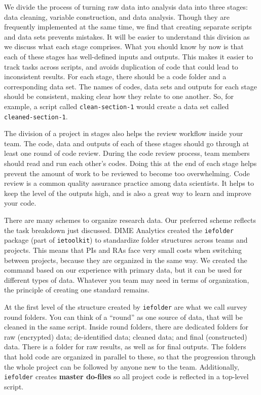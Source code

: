 We divide the process of turning raw data into analysis data into three stages: 
data cleaning, variable construction, and data analysis. 
Though they are frequently implemented at the same time, 
we find that creating separate scripts and data sets prevents mistakes. 
It will be easier to understand this division as we discuss what each stage comprises. 
What you should know by now is that each of these stages has well-defined inputs and outputs. 
This makes it easier to track tasks across scripts, 
and avoids duplication of code that could lead to inconsistent results. 
For each stage, there should be a code folder and a corresponding data set. 
The names of codes, data sets and outputs for each stage should be consistent,
making clear how they relate to one another. 
So, for example, a script called \texttt{clean-section-1} would create
a data set called \texttt{cleaned-section-1}.

The division of a project in stages also helps the review workflow inside your team.
The code, data and outputs of each of these stages should go through at least one round of code review.
During the code review process, team members should read and run each other's codes.
Doing this at the end of each stage helps prevent the amount of work to be reviewed to become too overwhelming.
Code review is a common quality assurance practice among data scientists.
It helps to keep the level of the outputs high, and is also a great way to learn and improve your code.

There are many schemes to organize research data. 
Our preferred scheme reflects the task breakdown just discussed.
DIME Analytics created the \texttt{iefolder}
package (part of \texttt{ietoolkit})
to standardize folder structures across teams and projects.
This means that PIs and RAs face very small costs when switching between projects, 
because they are organized in the same way.
We created the command based on our experience with primary data,
but it can be used for different types of data.
Whatever you team may need in terms of organization, 
the principle of creating one standard remains.

At the first level of the structure created by \texttt{iefolder} are what we call survey round folders.
You can think of a ``round'' as one source of data, 
that will be cleaned in the same script. 
Inside round folders, there are dedicated folders for 
raw (encrypted) data; de-identified data; cleaned data; and final (constructed) data. 
There is a folder for raw results, as well as for final outputs. 
The folders that hold code are organized in parallel to these, 
so that the progression through the whole project can be followed by anyone new to the team.  
Additionally, \texttt{iefolder} creates \textbf{master do-files} 
so all project code is reflected in a top-level script.

